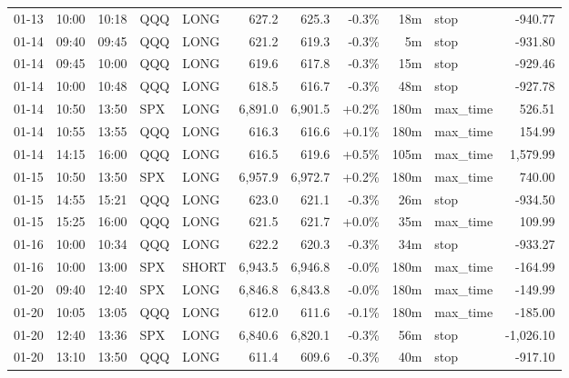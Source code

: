\documentclass[11pt,a4paper,twoside]{article}
\begin{document}
\begin{center}
\begin{longtable}{>{\color{txtmain}}l l l l l r r r r >{\color{txtmain}}l r}
01-13 & 10:00 & 10:18 & QQQ & LONG & 627.2 & 625.3 & \textcolor{lossred}{-0.3\%} & 18m & stop & \textcolor{lossred}{-940.77} \\
01-14 & 09:40 & 09:45 & QQQ & LONG & 621.2 & 619.3 & \textcolor{lossred}{-0.3\%} & 5m & stop & \textcolor{lossred}{-931.80} \\
01-14 & 09:45 & 10:00 & QQQ & LONG & 619.6 & 617.8 & \textcolor{lossred}{-0.3\%} & 15m & stop & \textcolor{lossred}{-929.46} \\
01-14 & 10:00 & 10:48 & QQQ & LONG & 618.5 & 616.7 & \textcolor{lossred}{-0.3\%} & 48m & stop & \textcolor{lossred}{-927.78} \\
01-14 & 10:50 & 13:50 & SPX & LONG & 6,891.0 & 6,901.5 & \textcolor{wingreen}{+0.2\%} & 180m & max\_time & \textcolor{wingreen}{526.51} \\
01-14 & 10:55 & 13:55 & QQQ & LONG & 616.3 & 616.6 & \textcolor{wingreen}{+0.1\%} & 180m & max\_time & \textcolor{wingreen}{154.99} \\
01-14 & 14:15 & 16:00 & QQQ & LONG & 616.5 & 619.6 & \textcolor{wingreen}{+0.5\%} & 105m & max\_time & \textcolor{wingreen}{1,579.99} \\
01-15 & 10:50 & 13:50 & SPX & LONG & 6,957.9 & 6,972.7 & \textcolor{wingreen}{+0.2\%} & 180m & max\_time & \textcolor{wingreen}{740.00} \\
01-15 & 14:55 & 15:21 & QQQ & LONG & 623.0 & 621.1 & \textcolor{lossred}{-0.3\%} & 26m & stop & \textcolor{lossred}{-934.50} \\
01-15 & 15:25 & 16:00 & QQQ & LONG & 621.5 & 621.7 & \textcolor{wingreen}{+0.0\%} & 35m & max\_time & \textcolor{wingreen}{109.99} \\
01-16 & 10:00 & 10:34 & QQQ & LONG & 622.2 & 620.3 & \textcolor{lossred}{-0.3\%} & 34m & stop & \textcolor{lossred}{-933.27} \\
01-16 & 10:00 & 13:00 & SPX & SHORT & 6,943.5 & 6,946.8 & \textcolor{lossred}{-0.0\%} & 180m & max\_time & \textcolor{lossred}{-164.99} \\
01-20 & 09:40 & 12:40 & SPX & LONG & 6,846.8 & 6,843.8 & \textcolor{lossred}{-0.0\%} & 180m & max\_time & \textcolor{lossred}{-149.99} \\
01-20 & 10:05 & 13:05 & QQQ & LONG & 612.0 & 611.6 & \textcolor{lossred}{-0.1\%} & 180m & max\_time & \textcolor{lossred}{-185.00} \\
01-20 & 12:40 & 13:36 & SPX & LONG & 6,840.6 & 6,820.1 & \textcolor{lossred}{-0.3\%} & 56m & stop & \textcolor{lossred}{-1,026.10} \\
01-20 & 13:10 & 13:50 & QQQ & LONG & 611.4 & 609.6 & \textcolor{lossred}{-0.3\%} & 40m & stop & \textcolor{lossred}{-917.10} \\

\end{longtable}
\end{center}
\end{document}
